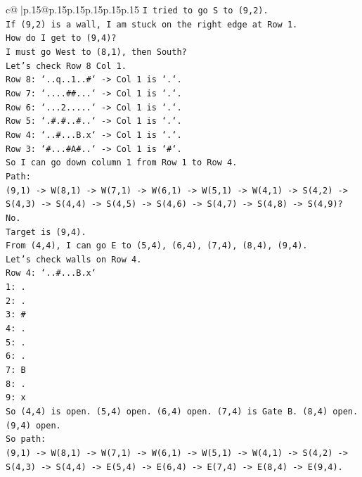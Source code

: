 \documentclass{article}
\begin{document}
{\begin{supertabular}{c@{$\;$}|p{.15\linewidth}@{}p{.15\linewidth}p{.15\linewidth}p{.15\linewidth}p{.15\linewidth}p{.15\linewidth}}
{{{\texttt{I tried to go S to (9,2).} \\
\texttt{If (9,2) is a wall, I am stuck on the right edge at Row 1.} \\
\texttt{How do I get to (9,4)?} \\
\texttt{I must go West to (8,1), then South?} \\
\texttt{Let's check Row 8 Col 1.} \\
\texttt{Row 8: `..q..1..\#` {-}> Col 1 is `.`.} \\
\texttt{Row 7: `....\#\#...` {-}> Col 1 is `.`.} \\
\texttt{Row 6: `...2.....` {-}> Col 1 is `.`.} \\
\texttt{Row 5: `.\#.\#..\#..` {-}> Col 1 is `.`.} \\
\texttt{Row 4: `..\#...B.x` {-}> Col 1 is `.`.} \\
\texttt{Row 3: `\#...\#A\#..` {-}> Col 1 is `\#`.} \\
\texttt{So I can go down column 1 from Row 1 to Row 4.} \\
\texttt{Path:} \\
\texttt{(9,1) {-}> W(8,1) {-}> W(7,1) {-}> W(6,1) {-}> W(5,1) {-}> W(4,1) {-}> S(4,2) {-}> S(4,3) {-}> S(4,4) {-}> S(4,5) {-}> S(4,6) {-}> S(4,7) {-}> S(4,8) {-}> S(4,9)? No.} \\
\texttt{Target is (9,4).} \\
\texttt{From (4,4), I can go E to (5,4), (6,4), (7,4), (8,4), (9,4).} \\
\texttt{Let's check walls on Row 4.} \\
\texttt{Row 4: `..\#...B.x`} \\
\texttt{1: .} \\
\texttt{2: .} \\
\texttt{3: \#} \\
\texttt{4: .} \\
\texttt{5: .} \\
\texttt{6: .} \\
\texttt{7: B} \\
\texttt{8: .} \\
\texttt{9: x} \\
\texttt{So (4,4) is open. (5,4) open. (6,4) open. (7,4) is Gate B. (8,4) open. (9,4) open.} \\
\texttt{So path:} \\
\texttt{(9,1) {-}> W(8,1) {-}> W(7,1) {-}> W(6,1) {-}> W(5,1) {-}> W(4,1) {-}> S(4,2) {-}> S(4,3) {-}> S(4,4) {-}> E(5,4) {-}> E(6,4) {-}> E(7,4) {-}> E(8,4) {-}> E(9,4).} \\
}}}
\end{supertabular}}
\end{document}
